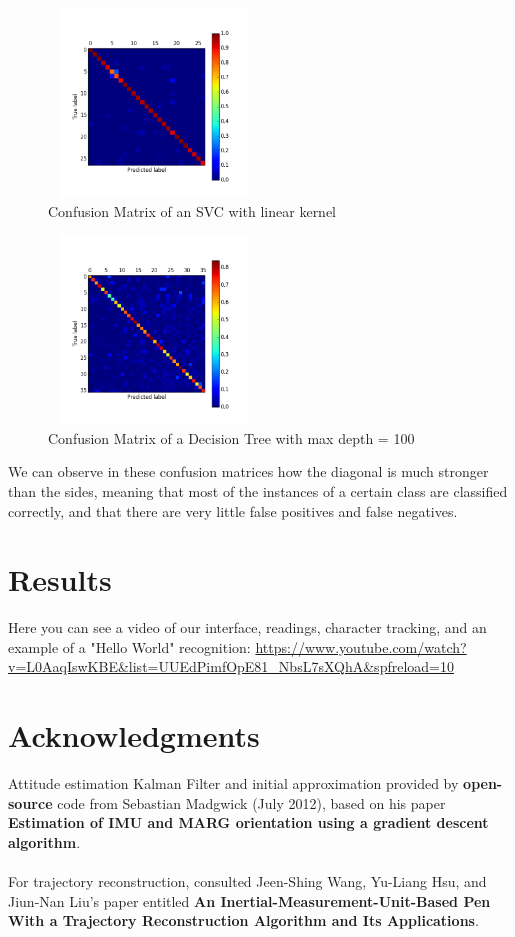 \documentclass{article}
\begin{document}
\begin{figure}[H]
	\centering
	\includegraphics[width=0.5\textwidth, height= 5cm]{cm_svm_francisco__svm.png}
	\caption{Confusion Matrix of an SVC with linear kernel}
\end{figure} 
\begin{figure}[H]
	\centering
	\includegraphics[width=0.5\textwidth, height= 5cm]{cm_tree1_dt.png}
	\caption{Confusion Matrix of a Decision Tree with max depth = 100}
\end{figure} 
We can observe in these confusion matrices how the diagonal is much stronger than the sides, meaning that most of the instances of a certain class are classified correctly, and that there are very little false positives and false negatives.


\section{Results}
Here you can see a video of our interface, readings, character tracking, and an example of a "Hello World" recognition: 
\url{https://www.youtube.com/watch?v=L0AaqIswKBE&list=UUEdPimfOpE81_NbsL7sXQhA&spfreload=10}

\section*{Acknowledgments} 
 
Attitude estimation Kalman Filter and initial approximation provided by \textbf{open-source} code from Sebastian Madgwick (July 2012), based on his paper \textbf{Estimation of IMU and MARG orientation using a gradient descent algorithm}.\\\\
For trajectory reconstruction, consulted Jeen-Shing Wang, Yu-Liang Hsu, and Jiun-Nan Liu's paper entitled \textbf{An Inertial-Measurement-Unit-Based Pen With a Trajectory Reconstruction Algorithm and Its Applications}.
%
%
\end{document}
